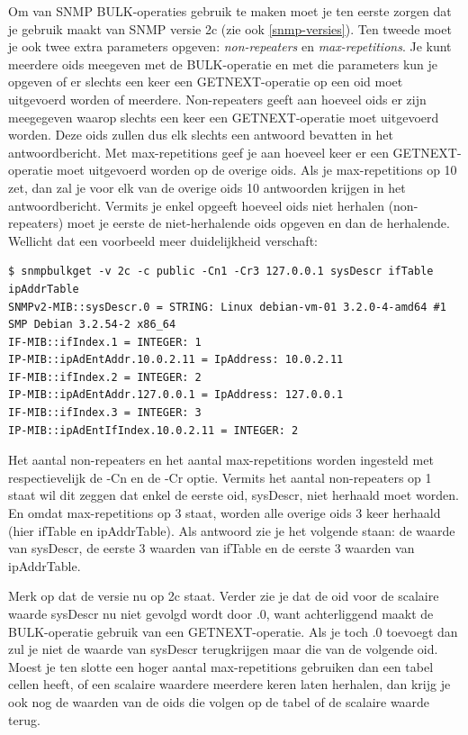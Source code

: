 Om van SNMP BULK-operaties gebruik te maken moet je ten eerste zorgen dat je gebruik maakt van SNMP versie 2c (zie ook \cref{snmp-versies}).
Ten tweede moet je ook twee extra parameters opgeven: \textit{non-repeaters} en \textit{max-repetitions}.
Je kunt meerdere \glspl{oid} meegeven met de BULK-operatie en met die parameters kun je opgeven of er slechts een keer
een GETNEXT-operatie op een \gls{oid} moet uitgevoerd worden of meerdere.
Non-repeaters geeft aan hoeveel \glspl{oid} er zijn meegegeven waarop slechts een keer een GETNEXT-operatie moet uitgevoerd worden.
Deze \glspl{oid} zullen dus elk slechts een antwoord bevatten in het antwoordbericht.
Met max-repetitions geef je aan hoeveel keer er een GETNEXT-operatie moet uitgevoerd worden op de overige \glspl{oid}.
Als je max-repetitions op 10 zet, dan zal je voor elk van de overige \glspl{oid} 10 antwoorden krijgen in het antwoordbericht.
Vermits je enkel opgeeft hoeveel \glspl{oid} niet herhalen (non-repeaters) moet je eerste de niet-herhalende \glspl{oid} opgeven en dan de herhalende.
Wellicht dat een voorbeeld meer duidelijkheid verschaft:

\begin{lstlisting}[float=h, caption={SNMP BULK-opdracht}, label=netsnmp-bulk]
$ snmpbulkget -v 2c -c public -Cn1 -Cr3 127.0.0.1 sysDescr ifTable ipAddrTable
SNMPv2-MIB::sysDescr.0 = STRING: Linux debian-vm-01 3.2.0-4-amd64 #1 SMP Debian 3.2.54-2 x86_64
IF-MIB::ifIndex.1 = INTEGER: 1
IP-MIB::ipAdEntAddr.10.0.2.11 = IpAddress: 10.0.2.11
IF-MIB::ifIndex.2 = INTEGER: 2
IP-MIB::ipAdEntAddr.127.0.0.1 = IpAddress: 127.0.0.1
IF-MIB::ifIndex.3 = INTEGER: 3
IP-MIB::ipAdEntIfIndex.10.0.2.11 = INTEGER: 2
\end{lstlisting}

Het aantal non-repeaters en het aantal max-repetitions worden ingesteld met respectievelijk de -Cn en de -Cr optie.
Vermits het aantal non-repeaters op 1 staat wil dit zeggen dat enkel de eerste \gls{oid}, sysDescr, niet herhaald moet worden.
En omdat max-repetitions op 3 staat, worden alle overige \glspl{oid} 3 keer herhaald (hier ifTable en ipAddrTable).
Als antwoord zie je het volgende staan: de waarde van sysDescr, de eerste 3 waarden van ifTable en de eerste 3 waarden van ipAddrTable.

Merk op dat de versie nu op 2c staat. Verder zie je dat de \gls{oid} voor de scalaire waarde sysDescr nu niet gevolgd wordt door .0,
want achterliggend maakt de BULK-operatie gebruik van een GETNEXT-operatie.
Als je toch .0 toevoegt dan zul je niet de waarde van sysDescr terugkrijgen maar die van de volgende \gls{oid}.
Moest je ten slotte een hoger aantal max-repetitions gebruiken dan een tabel cellen heeft,
of een scalaire waardere meerdere keren laten herhalen, dan krijg je ook nog de waarden van de \glspl{oid} die volgen op de tabel of de scalaire waarde terug.

